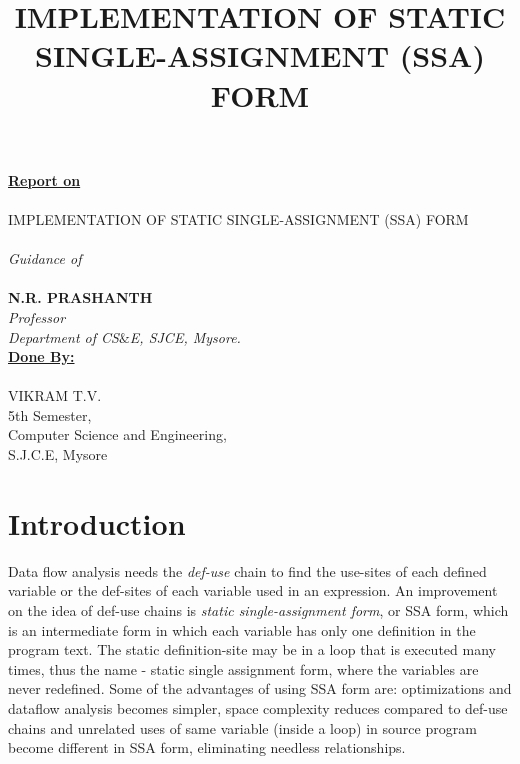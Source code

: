 \documentclass[10pt, oneside, a4paper]{article}
\begin{document}
\begin{center}
\textbf{\underline{Report on}}\\
\textsc{\\IMPLEMENTATION OF STATIC SINGLE-ASSIGNMENT (SSA) FORM\\}
\emph{\\Guidance of}\\
\textbf{\\N.R. PRASHANTH}\\
\textit{Professor}\\
\textit{Department of CS$\&$E, SJCE, Mysore.}\\
\vspace{1in}
\textbf{\underline{Done By:}}\\
\textsc{\\VIKRAM T.V.}\\
5th Semester,\\ Computer Science and Engineering,\\
S.J.C.E, Mysore\\
\title {IMPLEMENTATION OF STATIC SINGLE-ASSIGNMENT (SSA) FORM\\}
\end{center}
\newpage
\thispagestyle{empty}
\tableofcontents
\newpage
{}

\twocolumn
\section{Introduction}
Data flow analysis needs the \emph{def-use} chain to find the use-sites of each defined variable or the def-sites of each variable used in an expression.  An improvement on the idea of def-use chains is \emph{static single-assignment form}, or SSA form, which is an intermediate form in which each variable has only one definition in the program text.  The static definition-site may be in a loop that is executed many times, thus the name - static single assignment form, where the variables are never redefined.  Some of the advantages of using SSA form are: optimizations and dataflow analysis becomes simpler, space complexity reduces compared to def-use chains and unrelated uses of same variable (inside a loop) in source program become different in SSA form, eliminating needless relationships.
\end{document}
